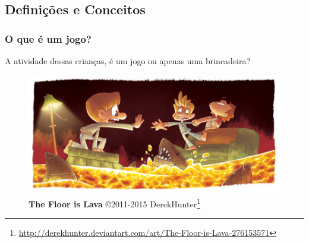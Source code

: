 \expandafter\documentclass\expandafter[table, usenames, svgnames, dvipsnames, \classopts]{beamer}
\begin{document}
\subsection{Definições e Conceitos}

\begin{frame}
	\frametitle{\textbf{O que é um jogo?}}

	\begin{center}
		A atividade dessas crianças, é um jogo ou apenas uma brincadeira?
	\end{center}	

	\vspace{-2em}
	
	\begin{figure}
		\centering
		\includegraphics[width=0.9\paperwidth]{floor-is-lava}
		\caption{\textbf{The Floor is Lava} \copyright{2011-2015} DerekHunter\footnote{\url{http://derekhunter.deviantart.com/art/The-Floor-is-Lava-276153571}}}
	\end{figure}
	
	\vspace{2em}

\end{frame}
\end{document}
